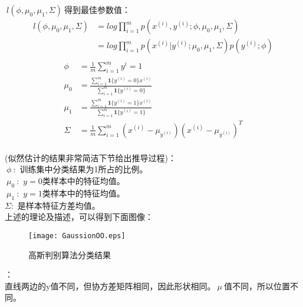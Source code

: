 $~l(\phi,\mu_0,\mu_1,\Sigma)~$得到最佳参数值：
\begin{equation}\nonumber
\begin{split}
  l(\phi,\mu_0,\mu_1,\Sigma)&=log\prod_{i=1}^{m}p(x^{(i)},y^{(i)};\phi,\mu_0,\mu_1,\Sigma)\\
  &=log\prod_{i=1}^{m}p(x^{(i)}|y^{(i)};\mu_0,\mu_1,\Sigma)p(y^{(i)};\phi)\\
\end{split}
\end{equation}
\begin{equation}\nonumber
\begin{split}
  \phi~&=\frac{1}{m}\sum_{i=1}^{m}{y^{i}=1}\\
  \mu_0&=\frac{\sum_{i=1}^{m}\textbf{1}\{y^{(i)}=0\}x^{(i)}}{\sum_{i=1}^{m}\textbf{1}\{y^{(i)}=0\}}\\
  \mu_1&=\frac{\sum_{i=1}^{m}\textbf{1}\{y^{(i)}=1\}x^{(i)}}{\sum_{i=1}^{m}\textbf{1}\{y^{(i)}=1\}}\\
  \Sigma&=\frac{1}{m}\sum_{i=1}^{m}(x^{(i)}-\mu_{y^{(i)}})(x^{(i)}-\mu_{y^{(i)}})^T\\
\end{split}
\end{equation}

(似然估计的结果非常简洁下节给出推导过程)：\\
$~\phi~$:~训练集中分类结果为1所占的比例。\\
$~\mu_0~$:~$y=0$类样本中的特征均值。\\
$~\mu_1~$:~$y=1$类样本中的特征均值。\\
$\Sigma$:~是样本特征方差均值。\\

 上述的理论及描述，可以得到下面图像：\\
\begin{figure}[!htbp]
  \centering
  \texttt{[image: GaussionOO.eps]}
  \caption{高斯判别算法分类结果}
\end{figure}

：\\
直线两边的y值不同，但协方差矩阵相同，因此形状相同。$~\mu~$值不同，所以位置不同。

